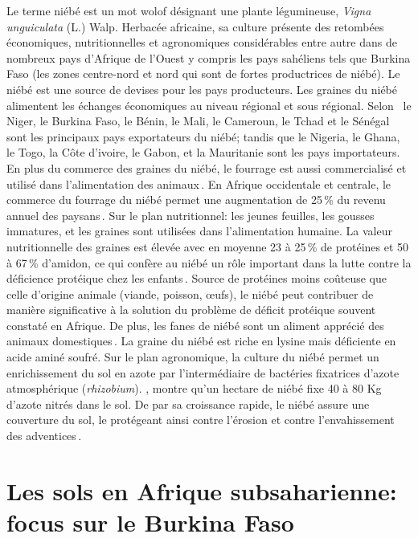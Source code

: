 \documentclass[a4paper,11pt]{article}
\begin{document}
Le terme niébé est un mot wolof désignant une plante légumineuse,
\emph{Vigna unguiculata} (L.) Walp. Herbacée africaine, sa culture
présente des retombées économiques, nutritionnelles et agronomiques
considérables entre autre dans de nombreux pays d'Afrique de l'Ouest y
compris les pays sahéliens tels que Burkina Faso (les zones
centre-nord et nord qui sont de fortes productrices de niébé).  Le
niébé est une source de devises pour les pays producteurs. Les graines
du niébé alimentent les échanges économiques au niveau régional et
sous régional. Selon
\citeauthor{Langyintuo_2003}\,\citeyear{Langyintuo_2003} le Niger, le
Burkina Faso, le Bénin, le Mali, le Cameroun, le Tchad et le Sénégal
sont les principaux pays exportateurs du niébé; tandis que le Nigeria,
le Ghana, le Togo, la Côte d'ivoire, le Gabon, et la Mauritanie sont
les pays importateurs. En plus du commerce des graines du niébé, le
fourrage est aussi commercialisé et utilisé dans l'alimentation des
animaux\,\cite{Langyintuo_2003}. En Afrique occidentale et centrale,
le commerce du fourrage du niébé permet une augmentation de 25\,\% du
revenu annuel des paysans\,\cite{Quin_1997}. Sur le plan nutritionnel:
les jeunes feuilles, les gousses immatures, et les graines sont
utilisées dans l'alimentation humaine. La valeur nutritionnelle des
graines est élevée avec en moyenne 23 à 25\,\% de protéines et 50 à
67\,\% d'amidon, ce qui confère au niébé un rôle important dans la
lutte contre la déficience protéique chez les
enfants\,\cite{Quin_1997}. Source de protéines moins coûteuse que
celle d'origine animale (viande, poisson, œufs), le niébé peut
contribuer de manière significative à la solution du problème de
déficit protéique souvent constaté en Afrique. De plus, les fanes de
niébé sont un aliment apprécié des animaux
domestiques\,\cite{BAMBARA_2008}. La graine du niébé est riche en
lysine mais déficiente en acide aminé soufré. Sur le plan agronomique,
la culture du niébé permet un enrichissement du sol en azote par
l'intermédiaire de bactéries fixatrices d'azote atmosphérique
(\emph{rhizobium}). \citeauthor{Quin_1997}\citeyear{Quin_1997}, montre qu'un
hectare de niébé fixe 40 à 80 Kg d'azote nitrés dans le sol. De par sa
croissance rapide, le niébé assure une couverture du sol, le protégeant
ainsi contre l'érosion et contre l'envahissement des
adventices\,\cite{Sawadogo_2009}.

\section{Les sols en Afrique subsaharienne: focus sur le Burkina Faso}
\end{document}
